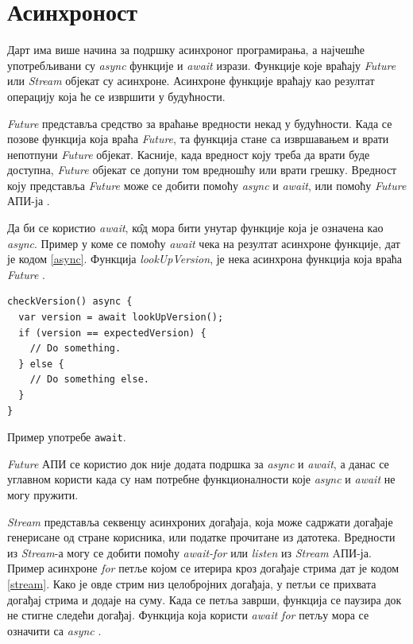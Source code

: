 \documentclass[12pt,oneside]{memoir}
\begin{document}
\section{Асинхроност}
\label{asinhronost}
Дарт има више начина за подршку асинхроног програмирања, а најчешће употребљивани су \textit{async} функције и \textit{await} изрази. Функције које враћају \textit{Future} или \textit{Stream} објекат су асинхроне. Асинхроне функције враћају као резултат операцију која ће се извршити у будућности.

\textit{Future} представља средство за враћање вредности некад у будућности. Када се позове функција која враћа \textit{Future}, та функција стане са извршавањем и врати непотпуни \textit{Future} објекат. Касније, када вредност коју треба да врати буде доступна, \textit{Future} објекат се допуни том вредношћу или врати грешку. Вредност коју представља \textit{Future} може се добити помоћу \textit{async} и \textit{await}, или помоћу \textit{Future} АПИ-ја \cite{dart, dart1}. 

Да би се користио \textit{await}, к\^{о}д мора бити унутар функције која је означена као \textit{async}. Пример у коме се помоћу \textit{await} чека на резултат асинхроне функције, дат је кодом \ref{async}. Функција \textit{lookUpVersion}, је нека асинхрона функција која враћа \textit{Future} \cite{dart, dart1}.

\begin{listing}
\begin{verbatim}
checkVersion() async {
  var version = await lookUpVersion();
  if (version == expectedVersion) {
    // Do something.
  } else {
    // Do something else.
  }
}
\end{verbatim}
\caption{Пример употребе \texttt{await}.}
\label{async}
\end{listing}

\textit{Future} АПИ се користио док није додата подршка за \textit{async} и \textit{await}, а данас се углавном користи када су нам потребне функционалности које \textit{async} и \textit{await} не могу пружити.

\textit{Stream} представља секвенцу асинхроних догађаја, која може садржати догађаје генерисане од стране корисника, или податке прочитане из датотека.  Вредности из \textit{Stream}-а могу се добити помоћу \textit{await-for} или \textit{listen} из \textit{Stream} AПИ-ја. Пример асинхроне \textit{for} петље којом се итерира кроз догађаје стрима дат је кодом \ref{stream}. Како је овде стрим низ целобројних догађаја, у петљи се прихвата догађај стрима и додаје на суму. Када се петља заврши, функција се паузира док не стигне следећи догађај. Функција која користи \textit{await for} петљу мора се означити са \textit{async} \cite{dart, dart1}.
\end{document}
